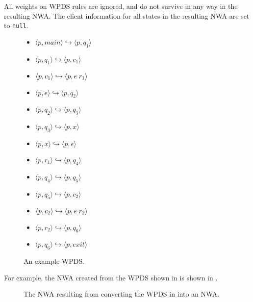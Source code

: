 All weights on WPDS rules are ignored, and do not survive in any way in the
resulting NWA. The client information for all states in the resulting NWA are
set to \texttt{null}.


\begin{figure}[t]
  \centering
    \begin{itemize}
      \centering
      \item{ $\langle p,main \rangle \hookrightarrow \langle p,q_1 \rangle$}
      \item{ $\langle p,q_1 \rangle \hookrightarrow \langle p,c_1 \rangle$}
      \item{ $\langle p,c_1 \rangle \hookrightarrow \langle p,e \hspace{.1cm} r_1 \rangle$}
      \item{ $\langle p,e \rangle \hookrightarrow \langle p,q_2 \rangle$}
      \item{ $\langle p,q_2 \rangle \hookrightarrow \langle p,q_3 \rangle$}
      \item{ $\langle p,q_3 \rangle \hookrightarrow \langle p,x \rangle$}
      \item{ $\langle p,x \rangle \hookrightarrow \langle p,\epsilon \rangle$}
      \item{ $\langle p,r_1 \rangle \hookrightarrow \langle p,q_4 \rangle$}
      \item{ $\langle p,q_4 \rangle \hookrightarrow \langle p,q_5 \rangle$}
      \item{ $\langle p,q_5 \rangle \hookrightarrow \langle p,c_2 \rangle$}
      \item{ $\langle p,c_2 \rangle \hookrightarrow \langle p,e \hspace{.1cm} r_2 \rangle$}
      \item{ $\langle p,r_2 \rangle \hookrightarrow \langle p,q_6 \rangle$}
      \item{ $\langle p,q_6 \rangle \hookrightarrow \langle p,exit \rangle$}
    \end{itemize}
  \caption{An example WPDS.}
  \label{Fi:WpdsToNwa1}
\end{figure}

For example, the NWA created from the WPDS shown in
 is shown in .

\begin{figure}[t]
  \centering
  \caption{The NWA resulting from converting the WPDS in  into an NWA.}
  \label{Fi:WpdsToNwa2}
\end{figure}



